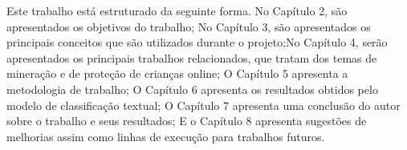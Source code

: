


Este trabalho está estruturado da seguinte forma. No Capítulo 2, são apresentados os objetivos do trabalho; No Capítulo 3, são apresentados os principais conceitos que são utilizados durante o projeto;No Capítulo 4, serão apresentados os principais trabalhos relacionados, que tratam dos temas de mineração e de proteção de crianças online; O Capítulo 5 apresenta a metodologia de trabalho; O Capítulo 6 apresenta os resultados obtidos pelo modelo de classificação textual; O Capítulo 7 apresenta uma conclusão do autor sobre o trabalho e seus resultados; E o Capítulo 8 apresenta sugestões de melhorias assim como linhas de execução para trabalhos futuros.

